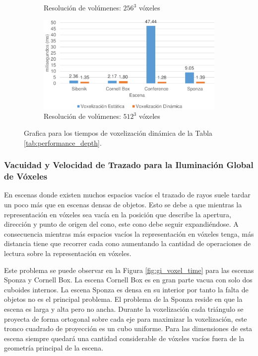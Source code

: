 \begin{figure}[H]
\begin{subfigure}{.49\textwidth}
		\caption*{Resolución de volúmenes: $256^3$ vóxeles}
	\end{subfigure}
	\begin{subfigure}{.49\textwidth}
		\centering
		\includegraphics[width=\linewidth]{media/voxelzation_512_cropped.pdf}	
		\caption*{Resolución de volúmenes: $512^3$ vóxeles}
	\end{subfigure}
	\caption{Grafica para los tiempos de voxelización dinámica de la Tabla \ref{tab:performance_depth}.}
	\label{fig:voxelization_times}
\end{figure}

\subsubsection{Vacuidad y Velocidad de Trazado para la Iluminación Global de Vóxeles}
\label{subsubsec:emptyness}

En escenas donde existen muchos espacios vacíos el trazado de rayos suele tardar un poco más que en escenas densas de objetos. Esto se debe a que mientras la representación en vóxeles sea vacía en la posición que describe la apertura, dirección y punto de origen del cono, este cono debe seguir expandiéndose. A consecuencia mientras más espacios vacíos la representación en vóxeles tenga, más distancia tiene que recorrer cada cono aumentando la cantidad de operaciones de lectura sobre la representación en vóxeles.

Este problema se puede observar en la Figura \ref{fig:gi_voxel_time} para las escenas Sponza y Cornell Box. La escena Cornell Box es en gran parte vacua con solo dos cuboides internos. La escena Sponza es densa en su interior por tanto la falta de objetos no es el principal problema. El problema de la Sponza reside en que la escena es larga y alta pero no ancha. Durante la voxelización cada triángulo se proyecta de forma ortogonal sobre cada eje para maximizar la voxelización, este tronco cuadrado de proyección es un cubo uniforme. Para las dimensiones de esta escena siempre quedará una cantidad considerable de vóxeles vacíos fuera de la geometría principal de la escena. 

